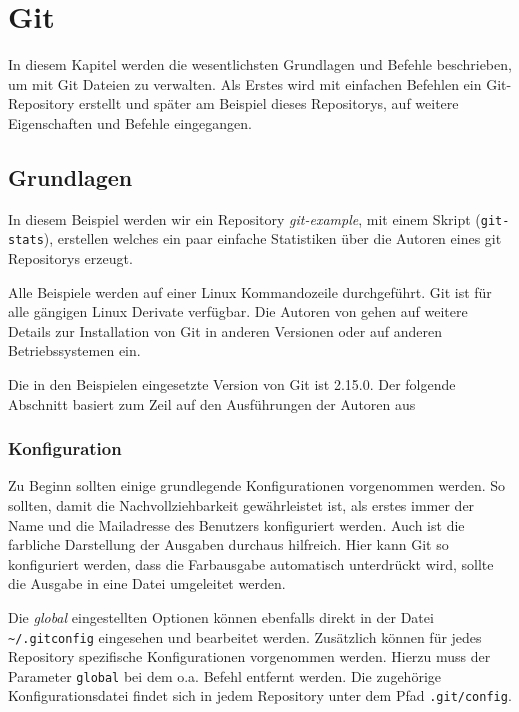\chapter{Git}\label{cha:git}
In diesem Kapitel werden die wesentlichsten Grundlagen und Befehle
beschrieben, um mit Git Dateien zu verwalten. Als Erstes wird mit einfachen
Befehlen ein Git-Repository erstellt und später am Beispiel dieses Repositorys,
auf weitere Eigenschaften und Befehle eingegangen.

\section{Grundlagen}\label{gitbasics}
In diesem Beispiel werden wir ein Repository \textit{git-example}, mit einem
Skript (\texttt{git-stats}), erstellen welches ein paar einfache Statistiken
über die Autoren eines git Repositorys erzeugt.

Alle Beispiele werden auf einer Linux Kommandozeile durchgeführt. Git ist für
alle gängigen Linux Derivate verfügbar. Die Autoren von \cite[S.~12-14]{progit}
gehen auf weitere Details zur Installation von Git in anderen Versionen oder
auf anderen Betriebssystemen ein.

Die in den Beispielen eingesetzte Version von Git ist 2.15.0. Der folgende
Abschnitt basiert zum Zeil auf den Ausführungen der Autoren aus
\cite[S.22-57]{gitosp}



\subsection{Konfiguration}\label{gitconfig}
Zu Beginn sollten einige grundlegende Konfigurationen vorgenommen werden. So
sollten, damit die Nachvollziehbarkeit gewährleistet ist, als erstes immer der
Name und die Mailadresse des Benutzers konfiguriert werden. Auch ist die
farbliche Darstellung der Ausgaben durchaus hilfreich. Hier kann Git so
konfiguriert werden, dass die Farbausgabe automatisch unterdrückt wird, sollte
die Ausgabe in eine Datei umgeleitet werden.



Die \textit{global} eingestellten Optionen können ebenfalls direkt in der Datei
\texttt{\textasciitilde/.gitconfig} eingesehen und bearbeitet werden.
Zusätzlich können für jedes Repository spezifische Konfigurationen vorgenommen
werden. Hierzu muss der Parameter \texttt{\-\-global} bei dem o.a. Befehl
entfernt werden. Die zugehörige Konfigurationsdatei findet sich in jedem
Repository unter dem Pfad \texttt{.git/config}.

